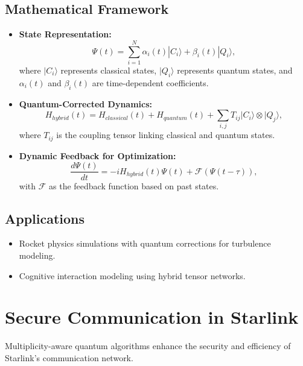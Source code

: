 \documentclass{article}
\theoremstyle{plain}
\begin{document}
\subsection{Mathematical Framework}
\begin{itemize}
  \item \textbf{State Representation:}
  \begin{equation}
  \Psi(t) = \sum_{i=1}^N \alpha_i(t) |C_i\rangle + \beta_i(t) |Q_i\rangle,
  \end{equation}
  where $|C_i\rangle$ represents classical states, $|Q_i\rangle$ represents quantum states, and $\alpha_i(t)$ and $\beta_i(t)$ are time-dependent coefficients.

  \item \textbf{Quantum-Corrected Dynamics:}
  \begin{equation}
  H_{hybrid}(t) = H_{classical}(t) + H_{quantum}(t) + \sum_{i,j} T_{ij} |C_i\rangle \otimes |Q_j\rangle,
  \end{equation}
  where $T_{ij}$ is the coupling tensor linking classical and quantum states.

  \item \textbf{Dynamic Feedback for Optimization:}
  \begin{equation}
  \frac{d\Psi(t)}{dt} = -i H_{hybrid}(t) \Psi(t) + \mathcal{F}(\Psi(t-\tau)),
  \end{equation}
  with $\mathcal{F}$ as the feedback function based on past states.
\end{itemize}

\subsection{Applications}
\begin{itemize}
  \item Rocket physics simulations with quantum corrections for turbulence modeling.
  \item Cognitive interaction modeling using hybrid tensor networks.
\end{itemize}

\section{Secure Communication in Starlink}
Multiplicity-aware quantum algorithms enhance the security and efficiency of Starlink’s communication network.
\end{document}
